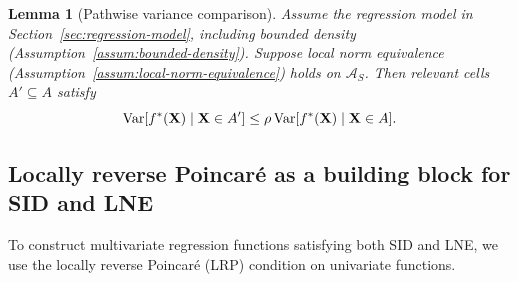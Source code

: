 \documentclass[11pt]{article}
\theoremstyle{plain}
\newtheorem{lemma}[theorem]{Lemma}
\theoremstyle{definition}
\theoremstyle{remark}
\theoremstyle{plain}
\newcommand{\bX}{\mathbf{X}}
\newcommand{\Var}{\textnormal{Var}}
\newcommand{\1}{\mathbbm{1}}
\begin{document}
\begin{lemma}[Pathwise variance comparison]
\label{lem:pathwise-variance-comparison-from-lne}
Assume the regression model in Section~\ref{sec:regression-model}, including bounded density (Assumption~\ref{assum:bounded-density}).
Suppose local norm equivalence (Assumption~\ref{assum:local-norm-equivalence}) holds on $\mathcal A_S$.
Then relevant cells $A'\subseteq A$ satisfy
\[
\Var[f^*(\bX)\mid\bX\in A']
\le
\rho\,\Var[f^*(\bX)\mid\bX\in A].
\]
\end{lemma}


\subsection{Locally reverse Poincar\'e as a building block for SID and LNE}


To construct multivariate regression functions satisfying both SID and LNE, we use the locally reverse Poincar\'e (LRP) condition on univariate functions.
\end{document}
